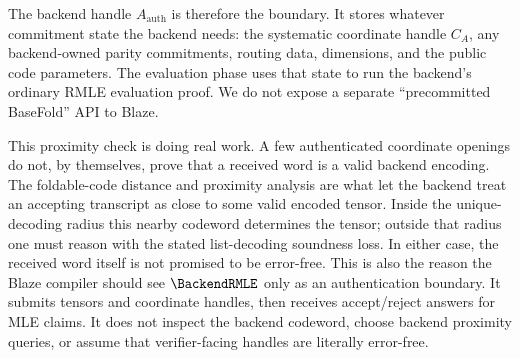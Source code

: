 The backend handle \(A_{\mathrm{auth}}\) is therefore the boundary.  It stores
whatever commitment state the backend needs: the systematic coordinate handle
\(C_A\), any backend-owned parity commitments, routing data, dimensions, and
the public code parameters.  The evaluation phase uses that state to run the
backend's ordinary RMLE evaluation proof.  We do not expose a separate
``precommitted BaseFold'' API to Blaze.

This proximity check is doing real work.  A few authenticated coordinate
openings do not, by themselves, prove that a received word is a valid backend
encoding.  The foldable-code distance and proximity analysis are what let the
backend treat an accepting transcript as close to some valid encoded tensor.
Inside the unique-decoding radius this nearby codeword determines the tensor;
outside that radius one must reason with the stated list-decoding soundness
loss.  In either case, the received word itself is not promised to be error-free.
This is also the reason the Blaze compiler should see \(\BackendRMLE\) only as
an authentication boundary.  It submits tensors and coordinate handles, then
receives accept/reject answers for MLE claims.  It does not inspect the backend
codeword, choose backend proximity queries, or assume that verifier-facing
handles are literally error-free.

